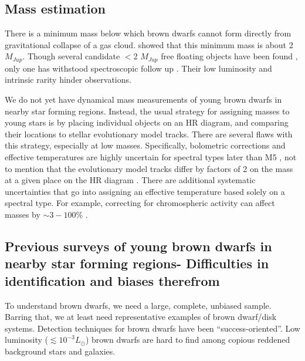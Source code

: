 \subsection{Mass estimation}

There is a minimum mass below which brown dwarfs cannot form directly from gravitational collapse of a gas cloud.  \citet{1976MNRAS.176..483R} showed that this minimum mass is about 2 $M_{Jup}$.  Though several candidate $<$2 $M_{Jup}$ free floating objects have been found \citep{2015A&A...574A.118P}, only one has withstood spectroscopic follow up \citep{2010ApJ...709L.158M}.  Their low luminosity and intrinsic rarity hinder observations.

We do not yet have dynamical mass measurements of young brown dwarfs in nearby star forming regions.  Instead, the usual strategy for assigning masses to young stars is by placing individual objects on an HR diagram, and comparing their locations to stellar evolutionary model tracks.  There are several flaws with this strategy, especially at low masses.  Specifically, bolometric corrections and effective temperatures are highly uncertain for spectral types later than M5 \citep{2013ApJS..208....9P}, not to mention that the evolutionary model tracks differ by factors of 2 on the mass at a given place on the HR diagram \citep{1994ApJS...90..467D,1998A&A...337..403B}.  There are additional systematic uncertainties that go into assigning an effective temperature based solely on a spectral type.  For example, correcting for chromospheric activity can affect masses by $\sim3-100\%$ \citep{2014ApJ...796..119S}.

\subsection{Previous surveys of young brown dwarfs in nearby star forming regions- Difficulties in identification and biases therefrom}

To understand brown dwarfs, we need a large, complete, unbiased sample.  Barring that, we at least need representative examples of brown dwarf/disk systems.  Detection techniques for brown dwarfs have been ``success-oriented''.  Low luminosity ($\lesssim10^{-3}L_{\odot}$) brown dwarfs are hard to find among copious reddened background stars and galaxies.

